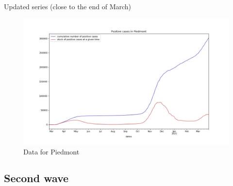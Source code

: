 \documentclass[8pt]{beamer}
\begin{document}
\begin{frame}{Updated series (close to the end of March)}

\begin{figure}[H]
\center
\includegraphics[scale=0.35]{andamento900.jpg}
\caption{Data for Piedmont} 
\label{dataP}
\end{figure}


\end{frame}




\subsection{Second wave}
\end{document}
